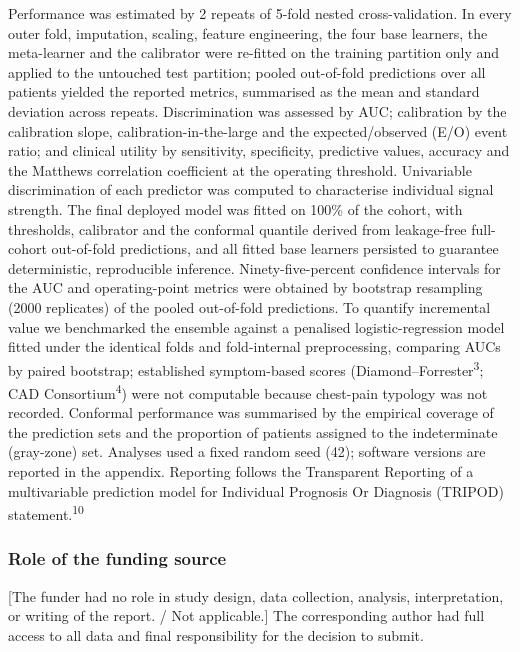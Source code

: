 \documentclass[
  english,
  11pt,
]{article}
\begin{document}
Performance was estimated by 2 repeats of 5-fold nested
cross-validation. In every outer fold, imputation, scaling, feature
engineering, the four base learners, the meta-learner and the calibrator
were re-fitted on the training partition only and applied to the
untouched test partition; pooled out-of-fold predictions over all
patients yielded the reported metrics, summarised as the mean and
standard deviation across repeats. Discrimination was assessed by AUC;
calibration by the calibration slope, calibration-in-the-large and the
expected/observed (E/O) event ratio; and clinical utility by
sensitivity, specificity, predictive values, accuracy and the Matthews
correlation coefficient at the operating threshold. Univariable
discrimination of each predictor was computed to characterise individual
signal strength. The final deployed model was fitted on 100\% of the
cohort, with thresholds, calibrator and the conformal quantile derived
from leakage-free full-cohort out-of-fold predictions, and all fitted
base learners persisted to guarantee deterministic, reproducible
inference. Ninety-five-percent confidence intervals for the AUC and
operating-point metrics were obtained by bootstrap resampling (2000
replicates) of the pooled out-of-fold predictions. To quantify
incremental value we benchmarked the ensemble against a penalised
logistic-regression model fitted under the identical folds and
fold-internal preprocessing, comparing AUCs by paired bootstrap;
established symptom-based scores (Diamond--Forrester\textsuperscript{3}; CAD Consortium\textsuperscript{4})
were not computable because chest-pain typology was not recorded.
Conformal performance was summarised by the empirical coverage of the
prediction sets and the proportion of patients assigned to the
indeterminate (gray-zone) set. Analyses used a fixed random seed (42);
software versions are reported in the appendix. Reporting follows the
Transparent Reporting of a multivariable prediction model for Individual
Prognosis Or Diagnosis (TRIPOD) statement.\textsuperscript{10}

\subsubsection{Role of the funding
source}\label{role-of-the-funding-source}

{[}The funder had no role in study design, data collection, analysis,
interpretation, or writing of the report. / Not applicable.{]} The
corresponding author had full access to all data and final
responsibility for the decision to submit.
\end{document}
